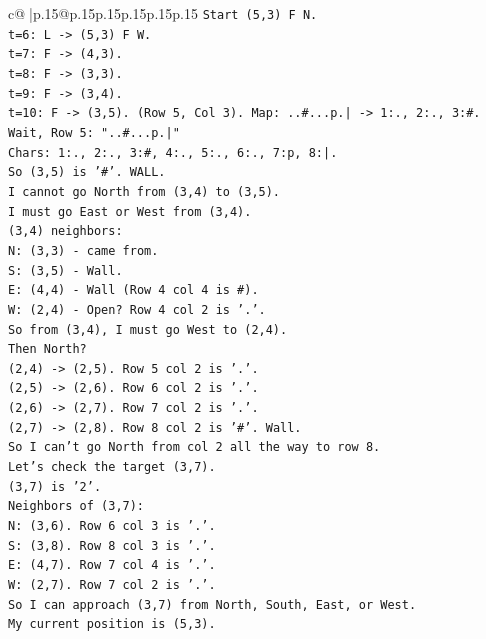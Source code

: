 \documentclass{article}
\begin{document}
{\begin{supertabular}{c@{$\;$}|p{.15\linewidth}@{}p{.15\linewidth}p{.15\linewidth}p{.15\linewidth}p{.15\linewidth}p{.15\linewidth}}
{{{\texttt{Start (5,3) F N.} \\
\texttt{t=6: L {-}> (5,3) F W.} \\
\texttt{t=7: F {-}> (4,3).} \\
\texttt{t=8: F {-}> (3,3).} \\
\texttt{t=9: F {-}> (3,4).} \\
\texttt{t=10: F {-}> (3,5). (Row 5, Col 3). Map: ..\#...p.| {-}> 1:., 2:., 3:\#.} \\
\texttt{Wait, Row 5: "..\#...p.|"} \\
\texttt{Chars: 1:., 2:., 3:\#, 4:., 5:., 6:., 7:p, 8:|.} \\
\texttt{So (3,5) is '\#'. WALL.} \\
\texttt{I cannot go North from (3,4) to (3,5).} \\
\texttt{I must go East or West from (3,4).} \\
\texttt{(3,4) neighbors:} \\
\texttt{N: (3,3) {-} came from.} \\
\texttt{S: (3,5) {-} Wall.} \\
\texttt{E: (4,4) {-} Wall (Row 4 col 4 is \#).} \\
\texttt{W: (2,4) {-} Open? Row 4 col 2 is '.'.} \\
\texttt{So from (3,4), I must go West to (2,4).} \\
\texttt{Then North?} \\
\texttt{(2,4) {-}> (2,5). Row 5 col 2 is '.'.} \\
\texttt{(2,5) {-}> (2,6). Row 6 col 2 is '.'.} \\
\texttt{(2,6) {-}> (2,7). Row 7 col 2 is '.'.} \\
\texttt{(2,7) {-}> (2,8). Row 8 col 2 is '\#'. Wall.} \\
\texttt{So I can't go North from col 2 all the way to row 8.} \\
\texttt{Let's check the target (3,7).} \\
\texttt{(3,7) is '2'.} \\
\texttt{Neighbors of (3,7):} \\
\texttt{N: (3,6). Row 6 col 3 is '.'.} \\
\texttt{S: (3,8). Row 8 col 3 is '.'.} \\
\texttt{E: (4,7). Row 7 col 4 is '.'.} \\
\texttt{W: (2,7). Row 7 col 2 is '.'.} \\
\texttt{So I can approach (3,7) from North, South, East, or West.} \\
\texttt{My current position is (5,3).} \\
}}}
\end{supertabular}}
\end{document}
